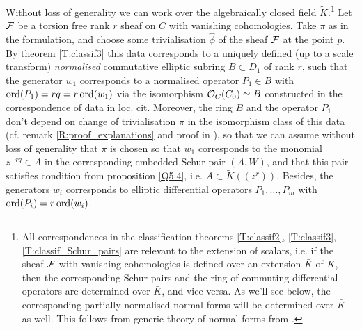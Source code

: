\documentclass[11pt]{article}
\theoremstyle{definition}
\newcommand{\ord}{\mathop{\rm ord}\nolimits}
\theoremstyle{plain}
\numberwithin{equation}{section}
\newcommand{\co}{{{\cal O}}}
\newcommand{\cf}{{{\cal F}}}
\begin{document}
Without loss of generality we can work over the algebraically closed field $\tilde{K}$.\footnote{All correspondences in the classification theorems \ref{T:classif2}, \ref{T:classif3}, \ref{T:classif_Schur_pairs} are relevant to the extension of scalars, i.e. if the sheaf $\cf$ with vanishing cohomologies is defined over an extension $\bar{K}$ of $K$, then the corresponding Schur pairs and the ring of commuting differential operators are determined over $\bar{K}$, and vice versa. As we'll see below, the corresponding partially normalised normal forms will be determined over $\bar{K}$ as well. This follows from generic theory of normal forms from \cite{GZ24}.} Let $\cf$ be a  torsion free rank $r$ sheaf on $C$ with vanishing cohomologies. Take $\pi$ as in the formulation, and choose some trivialisation 
$\hat{\phi}$ of the sheaf $\cf$ at the point $p$. By theorem \ref{T:classif3} this data corresponds to a  uniquely defined (up to a scale transform) {\it normalised} commutative elliptic subring $B\subset D_1$ of rank $r$, such that the generator $w_1$ corresponds to a normalised operator $P_1\in B$ with $\ord (P_1)=rq=r\ord (w_1)$ via the isomorphism $\co_C(C_0)\simeq B$ constructed in the correspondence of data in loc. cit. Moreover, the ring $B$ and the operator $P_1$ don't depend on change of trivialisation $\pi$ in the isomorphism class of this data (cf. remark \ref{R:proof_explanations} and  proof in \cite[Ch. 9,10]{Zheglov_book}), so that we can assume without loss of generality that $\pi$ is chosen so that $w_1$ corresponds to the monomial $z^{-rq}\in A$ in the corresponding embedded Schur pair $(A,W)$, and that this pair satisfies condition from proposition \ref{Q5.4}, i.e. $A\subset \tilde{K}((z^r))$. Besides, the generators $w_i$ corresponds to  elliptic differential operators $P_1, \ldots ,P_m$ with $\ord (P_i)=r\ord (w_i)$. 
\end{document}
